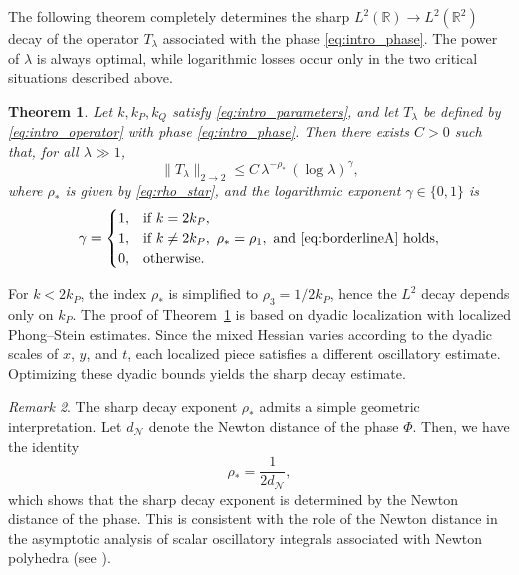 \documentclass[10pt]{amsart}
\numberwithin{equation}{section}
\newtheorem{theorem}{Theorem}[section]
\theoremstyle{definition}
\theoremstyle{remark}
\newtheorem{remark}[theorem]{Remark}
\theoremstyle{remark}
\begin{document}
    
	
	The following theorem completely determines the sharp
    $L^2(\mathbb R)\rightarrow L^2(\mathbb R^2)$
    decay of the operator $T_\lambda$ associated with the phase
    \eqref{eq:intro_phase}. The power of $\lambda$ is always optimal, while logarithmic losses occur
    only in the two critical situations described above.
	\begin{theorem}\label{thm:main}
		Let \(k,k_P,k_Q\) satisfy \eqref{eq:intro_parameters}, and let \(T_\lambda\) be defined by
		\eqref{eq:intro_operator} with phase \eqref{eq:intro_phase}.  Then there exists \(C>0\) such that, for all
		\(\lambda\gg1\),
		\begin{equation}\label{eq:upperbound_main}
			\|T_\lambda\|_{2\to2}
			\le C\,\lambda^{-\rho_*}\,(\log\lambda)^{\gamma},
		\end{equation}
		where \(\rho_*\) is given by \eqref{eq:rho_star}, and the logarithmic exponent \(\gamma\in\{0,1\}\) is
		\begin{equation}\label{eq:gamma_def}
			\gamma=
			\begin{cases}
				1,& \text{if } k=2k_P,\\
				1,& \text{if } k\neq 2k_P,\ \rho_*=\rho_1,\ \text{and }\eqref{eq:borderlineA}\text{ holds},\\
				0,& \text{otherwise}.
			\end{cases}
		\end{equation}
	\end{theorem}
    For $k<2k_P$, the index $\rho_*$ is simplified to $\rho_3 = 1/2k_P$, hence the $L^2$ decay depends only on $k_P$.
	The proof of Theorem~\ref{thm:main} is based on dyadic localization with localized Phong--Stein estimates. Since the mixed Hessian varies according to the dyadic scales of $x$, $y$, and
    $t$, each localized piece satisfies a different oscillatory estimate.
    Optimizing these dyadic bounds yields the sharp decay estimate.

    \begin{remark}
    The sharp decay exponent $\rho_*$ admits a simple geometric interpretation.
    Let $d_{\mathcal N}$ denote the Newton distance of the phase $\Phi$.
    Then, we have the identity
    \[
    \rho_*=\frac1{2d_{\mathcal N}},
    \]
    which shows that the sharp decay exponent is determined by the Newton distance of the
    phase. This is consistent with the role of the Newton distance in the asymptotic analysis of scalar oscillatory integrals associated with Newton polyhedra (see \cite{PS97}).
    \end{remark}
\end{document}
